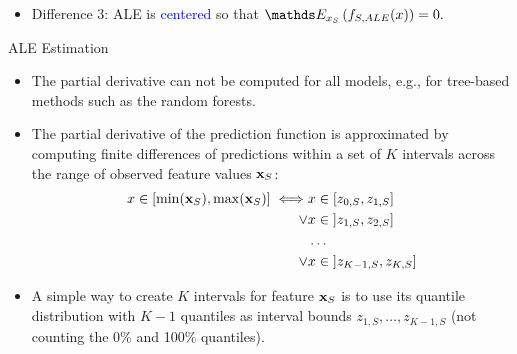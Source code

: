\documentclass[11pt,compress,t,notes=noshow, xcolor=table]{beamer}
\begin{document}
{\begin{itemize}
{    }
    \item<3-> Difference 3: ALE is \textcolor{blue}{centered} so that $\E_{x_S} \left( f_{S, ALE}(x) \right) = 0.$
    \end{itemize}
}


\begin{vbframe}{ALE Estimation}

\begin{itemize}
  \item The partial derivative can not be computed for all models, e.g., for tree-based methods such as the random forests.
  \item The partial derivative of the prediction function is approximated by computing finite differences of predictions within a set of $K$ intervals across the range of observed feature values $\xv_S$:
  $$
  \begin{aligned}
  x \in [\min(\xv_S), \max(\xv_S)] \iff &x \in [z_{0, S}, z_{1, S}] \\
  \lor &x \in \; ]z_{1, S}, z_{2, S}] \\
  &\dots \\
  \lor &x \in \; ]z_{K-1, S}, z_{K, S}]
  \end{aligned}
  $$
  \item A simple way to create $K$ intervals for feature $\xv_S$ is to use its quantile distribution with $K-1$ quantiles as interval bounds $z_{1,S}, \dots, z_{K-1,S}$ (not counting the 0\% and 100\% quantiles).
\end{itemize}

\end{vbframe}
\end{document}
